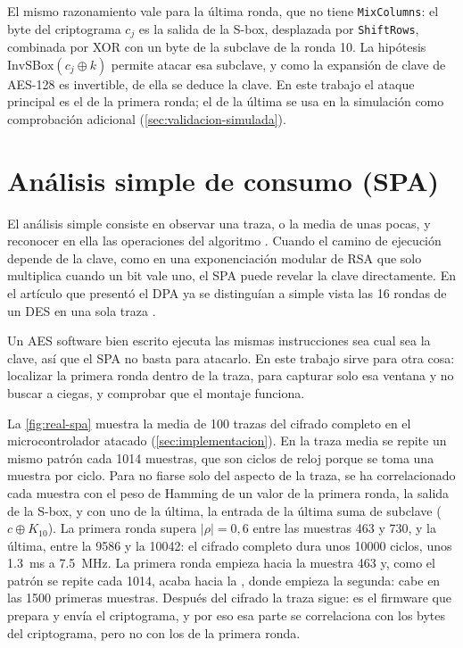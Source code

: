 El mismo razonamiento vale para la última ronda, que no tiene
\texttt{MixColumns}: el byte del criptograma $c_j$ es la salida de la S-box,
desplazada por \texttt{ShiftRows}, combinada por XOR con un byte de la subclave
de la ronda 10. La hipótesis $\mathrm{InvSBox}(c_j \oplus k)$ permite atacar
esa subclave, y como la expansión de clave de AES-128 es invertible, de ella se
deduce la clave. En este trabajo el ataque principal es el de la primera ronda;
el de la última se usa en la simulación como comprobación adicional
(\cref{sec:validacion-simulada}).

\section{Análisis simple de consumo (SPA)}
\label{sec:spa}

El análisis simple consiste en observar una traza, o la media de unas pocas, y
reconocer en ella las operaciones del algoritmo \cite[sec.~II.B.1]{mishra2025modern}.
Cuando el camino de ejecución depende de la clave, como en una exponenciación
modular de RSA que solo multiplica cuando un bit vale uno, el SPA puede revelar
la clave directamente. En el artículo que presentó el DPA ya se distinguían a
simple vista las 16 rondas de un DES en una sola traza \cite{kocher1999dpa}.

Un AES software bien escrito ejecuta las mismas instrucciones sea cual sea la
clave, así que el SPA no basta para atacarlo. En este trabajo sirve para otra
cosa: localizar la primera ronda dentro de la traza, para capturar solo esa
ventana y no buscar a ciegas, y comprobar que el montaje funciona.

La \cref{fig:real-spa} muestra la media de 100 trazas del cifrado completo en
el microcontrolador atacado (\cref{sec:implementacion}). En la traza media se
repite un mismo patrón cada \num{1014} muestras, que son ciclos de reloj
porque se toma una muestra por ciclo. Para no fiarse solo del aspecto de la
traza, se ha correlacionado cada muestra con el peso de Hamming de un valor de
la primera ronda, la salida de la S-box, y con uno de la última, la entrada de la
última suma de subclave ($c \oplus K_{10}$). La primera ronda supera
$|\rho| = 0{,}6$ entre las muestras 463 y 730, y la última, entre la
\num{9586} y la \num{10042}: el cifrado completo dura unos \num{10000}
ciclos, unos \qty{1,3}{\milli\second} a \qty{7,5}{\mega\hertz}. La primera
ronda empieza hacia la muestra 463 y, como el patrón se repite cada
\num{1014}, acaba hacia la \realRoundOneEnd, donde empieza la segunda: cabe en las
\num{1500} primeras muestras. Después del cifrado la traza
sigue: es el firmware que prepara y envía el criptograma, y por eso esa parte
se correlaciona con los bytes del criptograma, pero no con los de la primera
ronda.

